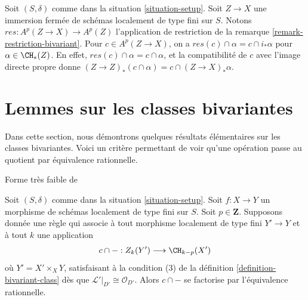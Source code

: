 \begin{remark}
\label{remark-res-push}
Soit $(S, \delta)$ comme dans la situation \ref{situation-setup}.
Soit $Z \to X$ une immersion fermée de schémas localement de
type fini sur $S$. Notons $res : A^p(Z \to X) \to A^p(Z)$
l'application de restriction de la remarque \ref{remark-restriction-bivariant}.
Pour $c \in A^p(Z \to X)$, on a
$res(c) \cap \alpha = c \cap i_*\alpha$ pour $\alpha \in \CH_*(Z)$.
En effet, $res(c) \cap \alpha = c \cap \alpha$,
et la compatibilité de $c$ avec l'image directe propre
donne $(Z \to Z)_*(c \cap \alpha) = c \cap (Z \to X)_*\alpha$.
\end{remark}






\section{Lemmes sur les classes bivariantes}
\label{section-bivariant-II}

\noindent
Dans cette section, nous démontrons quelques résultats élémentaires sur les
classes bivariantes. Voici un critère permettant de voir qu'une opération
passe au quotient par équivalence rationnelle.

\begin{lemma}
\label{lemma-factors-through-rational-equivalence}
\begin{reference}
Forme très faible de \cite[Théorème 17.1]{F}
\end{reference}
Soit $(S, \delta)$ comme dans la situation \ref{situation-setup}.
Soit $f : X \to Y$ un morphisme de schémas localement de type fini sur $S$.
Soit $p \in \mathbf{Z}$. Supposons donnée une règle
qui associe à tout morphisme localement de type fini $Y' \to Y$
et à tout $k$ une application
$$
c \cap - : Z_k(Y') \longrightarrow \CH_{k - p}(X')
$$
où $Y' = X' \times_X Y$, satisfaisant à la condition (3) de la
définition \ref{definition-bivariant-class}
dès que $\mathcal{L}'|_{D'} \cong \mathcal{O}_{D'}$. Alors
$c \cap -$ se factorise par l'équivalence rationnelle.
\end{lemma}

